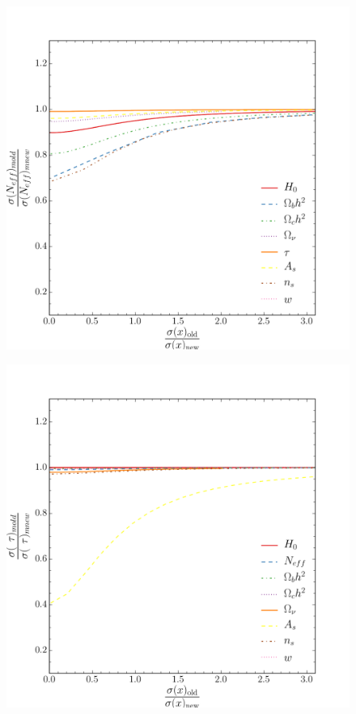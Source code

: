 \documentclass[aps,prd,preprint,groupedaddress]{revtex4-1}
\begin{document}
\begin{figure}[htbp]
\begin{center}
\includegraphics[scale=0.6]{prior_massless_neutrinos.pdf}
\caption{}
\label{fig:prior_massless_neutrinos}
\end{center}
\end{figure}


\begin{figure}[htbp]
\begin{center}
\includegraphics[scale=0.6]{prior_re_optical_depth.pdf}
\caption{}
\label{fig:prior_re_optical_depth}
\end{center}
\end{figure}
\end{document}
